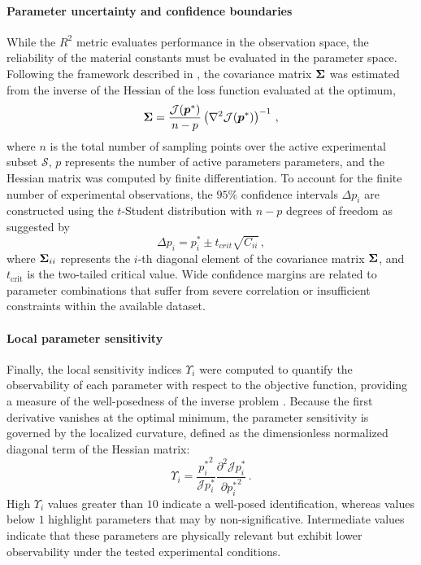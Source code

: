\paragraph{Parameter uncertainty and confidence boundaries}
While the $R^2$ metric evaluates performance in the observation space, the reliability of the material constants must be evaluated in the parameter space. Following the framework described in \cite{Seber_Nonlinear_regression}, the covariance matrix $\boldsymbol{\Sigma}$ was estimated from the inverse of the Hessian of the loss function evaluated at the optimum,
\begin{equation}
  \boldsymbol{\Sigma} = \frac{\mathcal{J}(\boldsymbol{p}^*)}{n-p}\left(\nabla^2\mathcal{J}(\boldsymbol{p}^*)\right)^{-1} \,,
\end{equation}
where $n$ is the total number of sampling points over the active experimental subset $\mathcal{S}$, $p$ represents the number of active parameters parameters, and the Hessian matrix was computed by finite differentiation.
To account for the finite number of experimental observations, the $95\%$ confidence intervals $\Delta p_i$ are constructed using the $t$-Student distribution with $n-p$ degrees of freedom as suggested by \cite{Montgommery_ApplStatistics}
\begin{equation}
  \Delta p_i = p_i^* \pm t_{crit} \sqrt{C_{ii}} \,,
\end{equation}
where $\boldsymbol{\Sigma}_{ii}$ represents the $i$-th diagonal element of the covariance matrix $\boldsymbol{\Sigma}$, and $t_{\text{crit}}$ is the two-tailed critical value. Wide confidence margins are related to parameter combinations that suffer from severe correlation or insufficient constraints within the available dataset.

\paragraph{Local parameter sensitivity}
Finally, the local sensitivity indices $\Upsilon_i$ were computed to quantify the observability of each parameter with respect to the objective function, providing a measure of the well-posedness of the inverse problem \cite{Tarantola_Inverse}. Because the first derivative vanishes at the optimal minimum, the parameter sensitivity is governed by the localized curvature, defined as the dimensionless normalized diagonal term of the Hessian matrix:
\begin{equation}
  \Upsilon_i = \frac{{p_i^*}^2}{\mathcal{J}{p_i^*}}\frac{\partial^2 \mathcal{J}{p_i^*}}{\partial {p_i^*}^2} \,.
\end{equation}
High $\Upsilon_i$ values greater than $10$ indicate a well-posed identification, whereas values below $1$ highlight parameters that may by non-significative. Intermediate values indicate that these parameters are physically relevant but exhibit lower observability under the tested experimental conditions.





